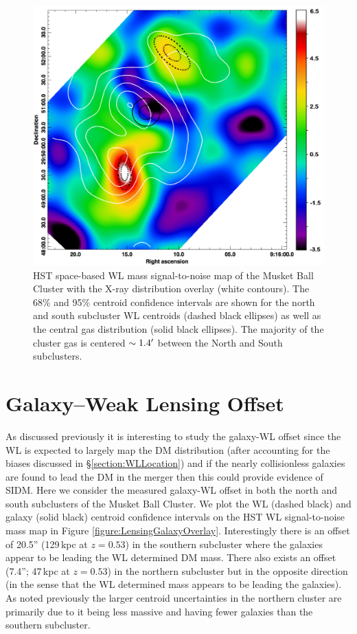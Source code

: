 \begin{figure}
\centering
\includegraphics[width=5in]{Chapter4/LensingXrayOverlay.png}
\caption[Musket Ball Cluster weak lensing signal-to-noise map with X-ray map overlay, including centroid locations.]{
HST space-based WL mass signal-to-noise map of the Musket Ball Cluster with the X-ray distribution overlay (white contours).
The 68\% and 95\% centroid confidence intervals are shown for the north and south subcluster WL centroids (dashed black ellipses) as well as the central gas distribution (solid black ellipses).
The majority of the cluster gas is centered $\sim1.4\mbox{$^\prime$}$ between the North and South subclusters.
}
\label{figure:LensingXrayOverlay}
\end{figure}


\section{Galaxy--Weak Lensing Offset}\label{section:GalaxyWLOffset}

As discussed previously it is interesting to study the galaxy-WL offset since the WL is expected to largely map the DM distribution (after accounting for the biases discussed in \S\ref{section:WLLocation}) and if the nearly collisionless galaxies are found to lead the DM in the merger then this could provide evidence of SIDM.
Here we consider the measured galaxy-WL offset in both the north and south subclusters of the Musket Ball Cluster.
We plot the WL (dashed black) and galaxy (solid black)  centroid confidence intervals on the HST WL signal-to-noise mass map in Figure \ref{figure:LensingGalaxyOverlay}.
Interestingly there is an offset of 20.5'' (129\,kpc at $z=0.53$) in the southern subcluster where the galaxies appear to be leading the WL determined DM mass.
There also exists an offset (7.4''; 47\,kpc at $z=0.53$) in the northern subcluster but in the opposite direction (in the sense that the WL determined mass appears to be leading the galaxies).
As noted previously the larger centroid uncertainties in the northern cluster are primarily due to it being less massive and having fewer galaxies than the southern subcluster.

